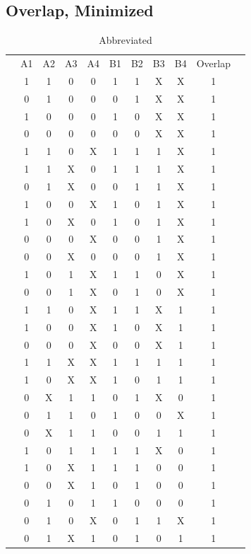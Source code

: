 \documentclass[letterpaper,titlepage,oneside]{article}
\begin{document}
\pagebreak

\subsection*{Overlap, Minimized}
\begin{table}['h']
\begin{center}

\begin{tabular}{c|c|c|c|c|c|c|c|c|c|c}
\cline{2-10}
 & A1 & A2 & A3 & A4 & B1 & B2 & B3 & B4 & Overlap &  \\ \cline{2-10}
 & 1 & 1 & 0 & 0 & 1 & 1 & X & X & 1 &  \\
 & 0 & 1 & 0 & 0 & 0 & 1 & X & X & 1 &  \\
 & 1 & 0 & 0 & 0 & 1 & 0 & X & X & 1 &  \\
 & 0 & 0 & 0 & 0 & 0 & 0 & X & X & 1 &  \\
 & 1 & 1 & 0 & X & 1 & 1 & 1 & X & 1 &  \\
 & 1 & 1 & X & 0 & 1 & 1 & 1 & X & 1 &  \\
 & 0 & 1 & X & 0 & 0 & 1 & 1 & X & 1 &  \\
 & 1 & 0 & 0 & X & 1 & 0 & 1 & X & 1 &  \\
 & 1 & 0 & X & 0 & 1 & 0 & 1 & X & 1 &  \\
 & 0 & 0 & 0 & X & 0 & 0 & 1 & X & 1 &  \\
 & 0 & 0 & X & 0 & 0 & 0 & 1 & X & 1 &  \\
 & 1 & 0 & 1 & X & 1 & 1 & 0 & X & 1 &  \\
 & 0 & 0 & 1 & X & 0 & 1 & 0 & X & 1 &  \\
 & 1 & 1 & 0 & X & 1 & 1 & X & 1 & 1 &  \\
 & 1 & 0 & 0 & X & 1 & 0 & X & 1 & 1 &  \\
 & 0 & 0 & 0 & X & 0 & 0 & X & 1 & 1 &  \\
 & 1 & 1 & X & X & 1 & 1 & 1 & 1 & 1 &  \\
 & 1 & 0 & X & X & 1 & 0 & 1 & 1 & 1 &  \\
 & 0 & X & 1 & 1 & 0 & 1 & X & 0 & 1 &  \\
 & 0 & 1 & 1 & 0 & 1 & 0 & 0 & X & 1 &  \\
 & 0 & X & 1 & 1 & 0 & 0 & 1 & 1 & 1 &  \\
 & 1 & 0 & 1 & 1 & 1 & 1 & X & 0 & 1 &  \\
 & 1 & 0 & X & 1 & 1 & 1 & 0 & 0 & 1 &  \\
 & 0 & 0 & X & 1 & 0 & 1 & 0 & 0 & 1 &  \\
 & 0 & 1 & 0 & 1 & 1 & 0 & 0 & 0 & 1 &  \\
 & 0 & 1 & 0 & X & 0 & 1 & 1 & X & 1 &  \\
 & 0 & 1 & X & 1 & 0 & 1 & 0 & 1 & 1 &  \\
\cline{2-10}
\end{tabular}

\caption{Abbreviated}\label{table:OverLap_Minimized}

\end{center}
\end{table}
\end{document}

